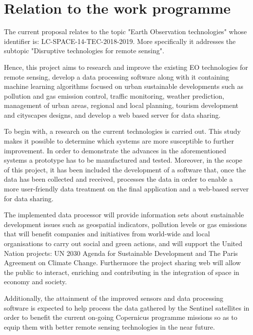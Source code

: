 \section{Relation to the work programme}
The current proposal relates to the topic "Earth Observation technologies" whose identifier is: LC-SPACE-14-TEC-2018-2019. More specifically it addresses the subtopic "Disruptive technologies for remote sensing". 

Hence, this project aims to research and improve the existing EO technologies for remote sensing, develop a data processing software along with it containing machine learning algorithms focused on urban sustainable developments such as pollution and gas emission control, traffic monitoring, weather prediction, management of urban areas, regional and local planning, tourism development and cityscapes designs, and develop a web based server for data sharing. 

To begin with, a research on the current technologies is carried out. This study makes it possible to determine which systems are more susceptible to further improvement. In order to demonstrate the advances in the aforementioned systems a prototype has to be manufactured and tested. Moreover, in the scope of this project, it has been included the development of a software that, once the data has been collected and received, processes the data in order to enable a more user-friendly data treatment on the final application and a web-based server for data sharing.

The implemented data processor will provide information sets about sustainable development issues such as geospatial indicators, pollution levels or gas emissions that will benefit companies and initiatives from world-wide and local organisations to carry out social and green actions, and will support the United Nation projects: UN 2030 Agenda for Sustainable Development and The Paris Agreement on Climate Change. Furthermore the project sharing web will allow the public to interact, enriching and contributing in the integration of space in economy and society.
 
Additionally, the attainment of the improved sensors and data processing software is expected to help process the data gathered by the Sentinel satellites in order to benefit the current on-going Copernicus programme missions so as to equip them with better remote sensing technologies in the near future.  